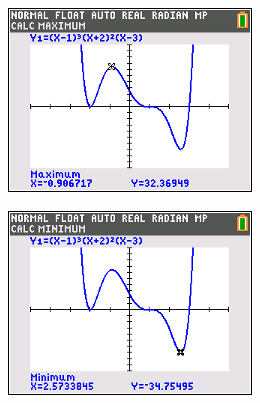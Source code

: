 \documentclass[letterpaper,12pt,fleqn]{article}
\begin{document}
\begin{enumerate}
\begin{enumerate}
    \includegraphics{hw12-2-2}

    \includegraphics{hw12-2-3}
    
  \end{enumerate}
  
\end{enumerate}
\end{document}
